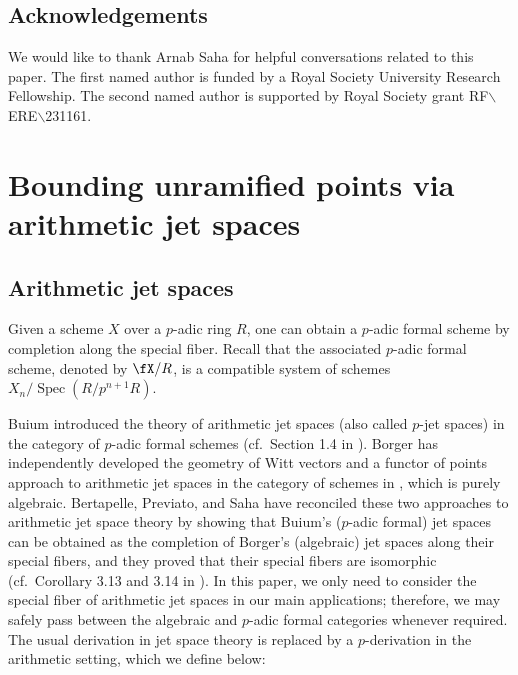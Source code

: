 \documentclass[11pt]{amsart}
\theoremstyle{plain}
\theoremstyle{definition}
\DeclareMathOperator{\Spec}{\mathrm{Spec}}
\newcommand{\netan}[1]{{\color{blue} \sf $\clubsuit\clubsuit\clubsuit$ Netan: [#1]}}
\newcommand{\sudip}[1]{{\color{purple} \sf $\clubsuit\clubsuit\clubsuit$ Sudip: [#1]}}
\begin{document}
\subsection{Acknowledgements}
We would like to thank Arnab Saha for helpful conversations related to this paper. The first named author is funded by a Royal Society University Research Fellowship. The second named author is supported by Royal Society grant  RF$\backslash$ERE$\backslash$231161.
\section{Bounding unramified points via arithmetic jet spaces}\label{sec:1}
\subsection{Arithmetic jet spaces}
Given a scheme $X$ over a $p$-adic ring $R$, one can obtain a $p$-adic formal scheme by completion along the special fiber. Recall that the associated $p$-adic formal scheme, denoted by $\fX/R$, is a compatible system of schemes $X_{n}/\Spec(R/p^{n+1}R)$.


Buium introduced the theory of arithmetic jet spaces (also called $p$-jet spaces) in the category of $p$-adic formal schemes (cf.\ Section 1.4 in \cite{buium:96, buium:95}). Borger has independently developed the geometry of Witt vectors and a functor of points approach to arithmetic jet spaces in the category of schemes in \cite{bor1} \cite{bor2}, which is purely algebraic. Bertapelle, Previato, and Saha have reconciled these two approaches to arithmetic jet space theory by showing that Buium's ($p$-adic formal) jet spaces can be obtained as the completion of Borger's (algebraic) jet spaces along their special fibers, and they proved that their special fibers are isomorphic (cf.\ Corollary 3.13 and 3.14 in \cite{BPS}). In this paper, we only need to consider the special fiber of arithmetic jet spaces in our main applications; therefore, we may safely pass between the algebraic and $p$-adic formal categories whenever required. The usual derivation in jet space theory is replaced by a $p$-derivation in the arithmetic setting, which we define below:
\end{document}

